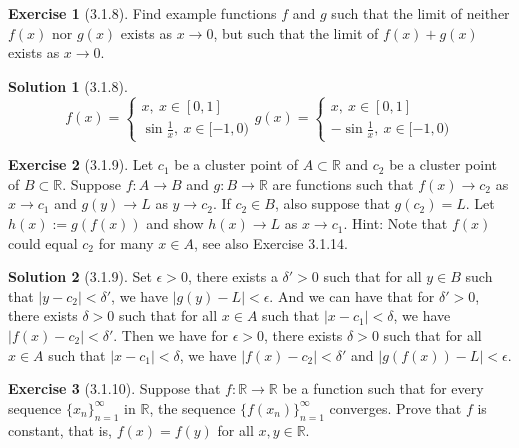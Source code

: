 \documentclass{article}
\theoremstyle{definition}
\newtheorem{exe}{Exercise}[section]
\newtheorem{sol}{Solution}[exe]
\begin{document}
\begin{exe}[3.1.8]
    Find example functions \( f \) and \( g \) such that the limit of neither \( f(x) \) nor \( g(x) \) exists as \( x \rightarrow 0 \), but such that the limit of \( f(x) + g(x) \) exists as \( x \rightarrow 0 \).
\end{exe}



\begin{sol}[3.1.8]
$$f(x)=\begin{cases}
    x,\ x\in [0,1]\\
    \sin\frac{1}{x},\ x\in [-1,0)
\end{cases} g(x)=\begin{cases}
    x,\ x\in [0,1]\\
    -\sin\frac{1}{x},\ x\in [-1,0)
\end{cases}$$

\end{sol}

\begin{exe}[3.1.9]
    Let \( c_1 \) be a cluster point of \( A \subset \mathbb{R} \) and \( c_2 \) be a cluster point of \( B \subset \mathbb{R} \). Suppose \( f: A \rightarrow B \) and \( g: B \rightarrow \mathbb{R} \) are functions such that \( f(x) \rightarrow c_2 \) as \( x \rightarrow c_1 \) and \( g(y) \rightarrow L \) as \( y \rightarrow c_2 \). If \( c_2 \in B \), also suppose that \( g(c_2) = L \). Let \( h(x) := g(f(x)) \) and show \( h(x) \rightarrow L \) as \( x \rightarrow c_1 \). Hint: Note that \( f(x) \) could equal \( c_2 \) for many \( x \in A \), see also Exercise 3.1.14.
\end{exe}

\begin{sol}[3.1.9]
Set $\epsilon>0$, there exists a $\delta'>0$ such that for all $y\in B$ such that $|y-c_2|<\delta'$, we have $|g(y)-L|<\epsilon$. And we can have that for $\delta'>0$, 
there exists $\delta>0$ such that for all $x\in A$ such that $|x-c_1|<\delta$, we have $|f(x)-c_2|<\delta'$. Then we have for $\epsilon>0$, there exists 
$\delta>0$ such that for all $x\in A$ such that $|x-c_1|<\delta$, we have $|f(x)-c_2|<\delta'$ and $|g(f(x))-L|<\epsilon$.
\end{sol}

\begin{exe}[3.1.10]
    Suppose that \( f: \mathbb{R} \rightarrow \mathbb{R} \) be a function such that for every sequence \( \{x_n\}_{n=1}^{\infty} \) in \( \mathbb{R} \), the sequence \( \{f(x_n)\}_{n=1}^{\infty} \) converges. Prove that \( f \) is constant, that is, \( f(x) = f(y) \) for all \( x, y \in \mathbb{R} \).
\end{exe}
\end{document}
